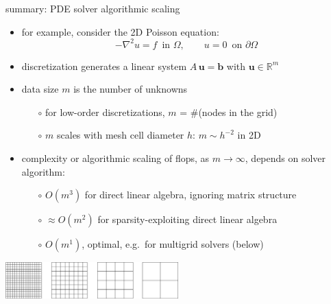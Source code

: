 \documentclass[svgnames,
               hyperref={colorlinks,citecolor=DeepPink4,linkcolor=FireBrick,urlcolor=Maroon},
               usepdftitle=false]  %
               {beamer}
\newcommand{\RR}{\mathbb{R}}
\newcommand{\grad}{\nabla}
\newcommand{\bb}{\mathbf{b}}
\newcommand{\bu}{\mathbf{u}}
\begin{document}
\begin{frame}{summary: PDE solver algorithmic scaling}

\begin{itemize}
\item for example, consider the 2D Poisson equation:
    $$-\grad^2 u = f \,\text{ in $\Omega$}, \qquad u=0 \,\text{ on $\partial\Omega$}$$
\item discretization generates a linear system $A\,\bu = \bb$ with $\bu\in\RR^m$
\item data size $m$ is the number of unknowns
    \begin{itemize}
    \item[$\circ$] for low-order discretizations, $m$ = \#(nodes in the grid)
    \item[$\circ$] $m$ scales with mesh cell diameter $h$: \quad $m \sim h^{-2}$ in 2D
    \end{itemize}
\item \alert{complexity} or \alert{algorithmic scaling} of flops, as $m\to\infty$, depends on solver algorithm:
    \begin{itemize}
    \item[$\circ$] $O(m^3)$ for direct linear algebra, ignoring matrix structure
    \item[$\circ$] $\approx O(m^2)$ for sparsity-exploiting direct linear algebra
    \item[$\circ$] $O(m^1)$, \alert{optimal}, e.g.~for \alert{multigrid} solvers (below)
    \end{itemize}
\end{itemize}

\medskip
\begin{center}
\includegraphics[width=0.5\textwidth]{../images/multigrid-grids.png}
\end{center}
\end{frame}
\end{document}

